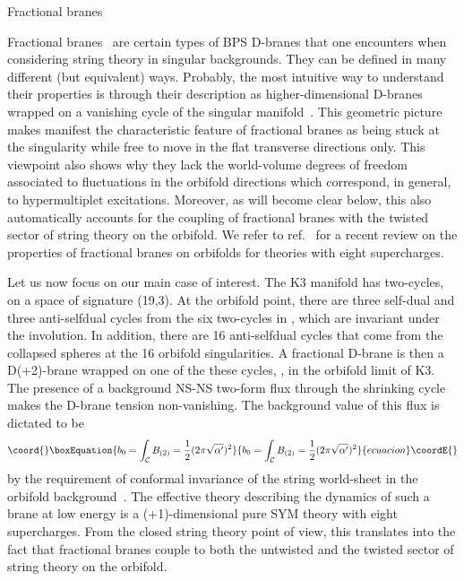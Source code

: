 \documentclass[a4paper,11pt]{article}
\makeatletter
\renewcommand{\subsection}{\@startsection{subsection}{2}{\z@} {-3.25ex
plus -1ex minus -.2ex}{1.5ex plus .2ex}{\normalsize\bf}}
\providecommand{\ZZ}{\mathbb{Z}}  \providecommand{\Zint}{\mathbb{Z}}
\makeatother
\begin{document}
\subsection{Fractional branes}

Fractional
branes~\cite{Douglas:1997xg,Douglas:1997de,Polchinski:1997ry} are
certain types of BPS D-branes that one encounters when considering
string theory in singular backgrounds. They can be defined in many
different (but equivalent) ways. Probably, the most intuitive way to
understand their properties is through their description as
higher-dimensional D-branes wrapped on a vanishing cycle of the
singular manifold~\cite{Diaconescu:1998br,Billo:2000yb}. This
geometric picture makes manifest the characteristic feature of
fractional branes as being stuck at the singularity while free to move
in the flat transverse directions only. This viewpoint also shows why
they lack the world-volume degrees of freedom associated to
fluctuations in the orbifold directions which correspond, in general,
to hypermultiplet excitations. Moreover, as will become clear below,
this also automatically accounts for the coupling of fractional branes
with the twisted sector of string theory on the orbifold. We refer to
ref.~\cite{Bertolini:2001gq} for a recent review on the properties of
fractional branes on orbifolds for theories with eight supercharges.

Let us now focus on our main case of interest. The K3 manifold has
\coordHE{} two-cycles, on a space
of signature (19,3). At the \myHighlight{$\ZZ_2$}\coordHE{} orbifold point, there are three
self-dual and three anti-selfdual cycles from the six two-cycles in
\coordHE{}, which are invariant under the \myHighlight{$\ZZ_2$}\coordHE{} involution. In
addition, there are 16 anti-selfdual cycles that come from the
collapsed spheres at the 16 orbifold singularities. A fractional
D\coordHE{}-brane is then a D(\coordHE{}+2)-brane wrapped on one of the these
cycles, \coordHE{}, in the \myHighlight{$\ZZ_2$}\coordHE{} orbifold limit of K3. The
presence of a background NS-NS two-form flux through the shrinking
cycle makes the D-brane tension non-vanishing. The background value
of this flux is dictated to be
\begin{equation}\coord{}\boxEquation{
\label{bgPhi}
b_0 = \int_{\mathcal{C}} B_{(2)} = \frac{1}{2}(2\pi\sqrt{\alpha'})^2
}{
b_0 = \int_{\mathcal{C}} B_{(2)} = \frac{1}{2}(2\pi\sqrt{\alpha'})^2
}{ecuacion}\coordE{}\end{equation}
by the requirement of conformal invariance of the string world-sheet
in the orbifold background~\cite{Aspinwall:1996mn}. The effective
theory describing the dynamics of such a brane at low energy is a
(\coordHE{}+1)-dimensional pure SYM theory with eight supercharges. From the
closed string theory point of view, this translates into the fact that
fractional branes couple to both the untwisted and the twisted sector
of string theory on the orbifold.
\end{document}
